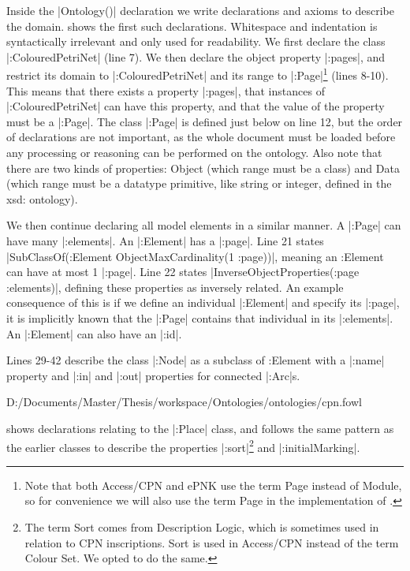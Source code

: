 Inside the |Ontology()| declaration we write declarations and axioms to describe
the domain.  shows the first such declarations. Whitespace
and indentation is syntactically irrelevant and only used for readability. We
first declare the class |:ColouredPetriNet| (line 7). We then declare the object
property |:pages|, and restrict its domain to |:ColouredPetriNet| and its range
to |:Page|\footnote{Note that both Access/CPN and ePNK use the term Page instead
of Module, so for convenience we will also use the term Page in the
implementation of \thename{}.} (lines 8-10). This means that there exists a
property |:pages|, that instances of |:ColouredPetriNet| can have this property,
and that the value of the property must be a |:Page|. The class |:Page| is
defined just below on line 12, but the order of declarations are not important,
as the whole document must be loaded before any processing or reasoning can be
performed on the ontology. Also note that there are two kinds of properties:
Object (which range must be a class) and Data (which range must be a datatype
primitive, like string or integer, defined in the xsd: ontology).

We then continue declaring all model elements in a similar manner. A |:Page| can
have many |:elements|. An |:Element| has a |:page|. Line 21 states
|SubClassOf(:Element ObjectMaxCardinality(1 :page))|, meaning an :Element can
have at most 1 |:page|.
Line 22 states |InverseObjectProperties(:page :elements)|, defining these
properties as inversely related. An example consequence of this is if we define
an individual |:Element| and specify its |:page|, it is implicitly known that
the |:Page| contains that individual in its |:elements|. An |:Element| can also
have an |:id|.

Lines 29-42 describe the class |:Node| as a subclass of :Element with a |:name|
property and |:in| and |:out| properties for connected |:Arc|s.


{D:/Documents/Master/Thesis/workspace/Ontologies/ontologies/cpn.fowl} 

 shows declarations relating to the |:Place| class, and
follows the same pattern as the earlier classes to describe the properties
|:sort|\footnote{The term Sort comes from Description Logic, which is 
sometimes used in relation to CPN inscriptions. Sort is used in Access/CPN
instead of the term Colour Set. We opted to do the same.} and |:initialMarking|.

